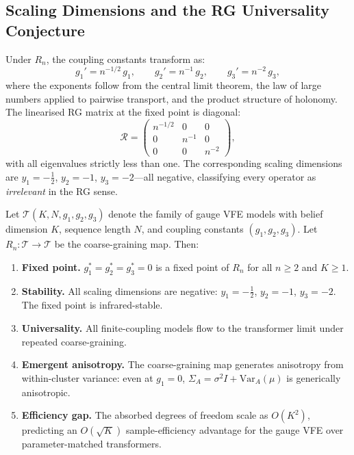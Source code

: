 \documentclass[twoside,11pt]{article}
\begin{document}
\subsection{Scaling Dimensions and the RG Universality Conjecture}

Under $R_n$, the coupling constants transform as:
\begin{equation}
g_1' = n^{-1/2}\, g_1, \qquad g_2' = n^{-1}\, g_2, \qquad g_3' = n^{-2}\, g_3,
\label{eq:rg_scaling_supp}
\end{equation}
where the exponents follow from the central limit theorem, the law of large numbers applied to pairwise transport, and the product structure of holonomy. The linearised RG matrix at the fixed point is diagonal:
\begin{equation}
\mathcal{R} = \begin{pmatrix} n^{-1/2} & 0 & 0 \\ 0 & n^{-1} & 0 \\ 0 & 0 & n^{-2} \end{pmatrix},
\label{eq:rg_matrix_supp}
\end{equation}
with all eigenvalues strictly less than one.  The corresponding scaling dimensions are $y_1 = -\tfrac{1}{2}$, $y_2 = -1$, $y_3 = -2$---all negative, classifying every operator as \emph{irrelevant} in the RG sense.

\begin{conjecture}
\label{conj:rg_universality_supp}
Let $\mathcal{T}(K, N, g_1, g_2, g_3)$ denote the family of gauge VFE models with belief dimension $K$, sequence length $N$, and coupling constants $(g_1, g_2, g_3)$. Let $R_n: \mathcal{T} \to \mathcal{T}$ be the coarse-graining map. Then:
\begin{enumerate}
\item[(i)] \textbf{Fixed point.} $g_1^* = g_2^* = g_3^* = 0$ is a fixed point of $R_n$ for all $n \geq 2$ and $K \geq 1$.
\item[(ii)] \textbf{Stability.} All scaling dimensions are negative: $y_1 = -\tfrac{1}{2}$, $y_2 = -1$, $y_3 = -2$.  The fixed point is infrared-stable.
\item[(iii)] \textbf{Universality.} All finite-coupling models flow to the transformer limit under repeated coarse-graining.
\item[(iv)] \textbf{Emergent anisotropy.} The coarse-graining map generates anisotropy from within-cluster variance: even at $g_1 = 0$, $\Sigma_A = \sigma^2 I + \mathrm{Var}_A(\mu)$ is generically anisotropic.
\item[(v)] \textbf{Efficiency gap.} The absorbed degrees of freedom scale as $O(K^2)$, predicting an $O(\sqrt{K})$ sample-efficiency advantage for the gauge VFE over parameter-matched transformers.
\end{enumerate}
\end{conjecture}
\end{document}
